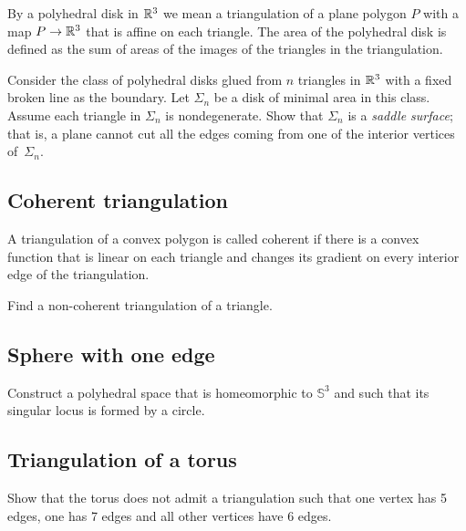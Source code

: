 By a polyhedral disk in $\mathbb{R}^3$
we mean a triangulation of a plane polygon $P$ with a map $P\to\mathbb{R}^3$ that is affine on each triangle.
The area of the polyhedral disk is defined as the sum of areas of the images of the triangles in the triangulation.

\begin{pr}
Consider the class of polyhedral disks glued from $n$ triangles in $\mathbb{R}^3$
with a fixed broken line as the boundary.
Let $\Sigma_n$ be a disk of minimal area in this class. Assume each triangle in $\Sigma_n$ is nondegenerate.
Show that $\Sigma_n$ is a \emph{saddle surface};
that is, a plane cannot cut all the edges coming from one of the interior vertices of~$\Sigma_n$.
\end{pr}

\subsection*{Coherent triangulation\easy}\label{Coherent triangulation} 

A triangulation of a convex polygon is called coherent if there is a convex function that is linear on each triangle and changes its gradient on every interior edge of the triangulation.

\begin{pr}
Find a non-coherent triangulation of a triangle.
\end{pr}



\subsection*{Sphere with one edge\hard}\label{panov-S^3} 

\begin{pr}
Construct a polyhedral space that is homeomorphic to $\mathbb{S}^3$ and such that its singular locus is formed by a circle.
\end{pr}


\subsection*{Triangulation of a torus}\label{Triangulation of a torus}

\begin{pr}
Show that the torus does not admit a triangulation 
such that one vertex has 5 edges,
one has 7 edges and 
all other vertices have 
6 edges. 
\end{pr}


